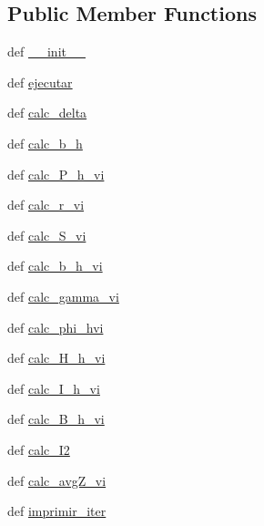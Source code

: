 \subsection*{Public Member Functions}
\begin{DoxyCompactItemize}
\item 
def \hyperlink{classmodel__template_1_1_model_template_a22197c6b1c038b67b9f414b2a0b12846}{\-\_\-\-\_\-init\-\_\-\-\_\-}
\item 
def \hyperlink{classmodel__template_1_1_model_template_af0d165e3670fa2ab8dc95fccbd1000fc}{ejecutar}
\item 
def \hyperlink{classmodel__template_1_1_model_template_a9727f5ca1d701411213cc94c9ce03794}{calc\-\_\-delta}
\item 
def \hyperlink{classmodel__template_1_1_model_template_a99a7f880441811cf7b09780bf099115f}{calc\-\_\-b\-\_\-h}
\item 
def \hyperlink{classmodel__template_1_1_model_template_a9f8c5a5dc9e9a2398b58f72a78fc6f2a}{calc\-\_\-\-P\-\_\-h\-\_\-vi}
\item 
def \hyperlink{classmodel__template_1_1_model_template_af83077979e5346923e200bbafbfbeae4}{calc\-\_\-r\-\_\-vi}
\item 
def \hyperlink{classmodel__template_1_1_model_template_aa32093145d0c97c2b57c19c050fe45ed}{calc\-\_\-\-S\-\_\-vi}
\item 
def \hyperlink{classmodel__template_1_1_model_template_ab811af1260ed4508b9a7b9add11ddaa7}{calc\-\_\-b\-\_\-h\-\_\-vi}
\item 
def \hyperlink{classmodel__template_1_1_model_template_adc23f1d97101b711175e59567f42d31e}{calc\-\_\-gamma\-\_\-vi}
\item 
def \hyperlink{classmodel__template_1_1_model_template_af619b3107d5ec929898af992d0f808e8}{calc\-\_\-phi\-\_\-hvi}
\item 
def \hyperlink{classmodel__template_1_1_model_template_a6a38f083f47055d4a133efdb0172276d}{calc\-\_\-\-H\-\_\-h\-\_\-vi}
\item 
def \hyperlink{classmodel__template_1_1_model_template_a09ce6d25691672785a5ea7c980f0759d}{calc\-\_\-\-I\-\_\-h\-\_\-vi}
\item 
def \hyperlink{classmodel__template_1_1_model_template_a2bd2a69420be014cdf22d3656027ea29}{calc\-\_\-\-B\-\_\-h\-\_\-vi}
\item 
def \hyperlink{classmodel__template_1_1_model_template_a4fae6780c272da5c8c01e9fde800bb01}{calc\-\_\-\-I2}
\item 
def \hyperlink{classmodel__template_1_1_model_template_a304db21d5d560062f31e5c2493406f1c}{calc\-\_\-avg\-Z\-\_\-vi}
\item 
def \hyperlink{classmodel__template_1_1_model_template_a2f35480a0987ceacd1737c12f8398bb0}{imprimir\-\_\-iter}
\end{DoxyCompactItemize}
